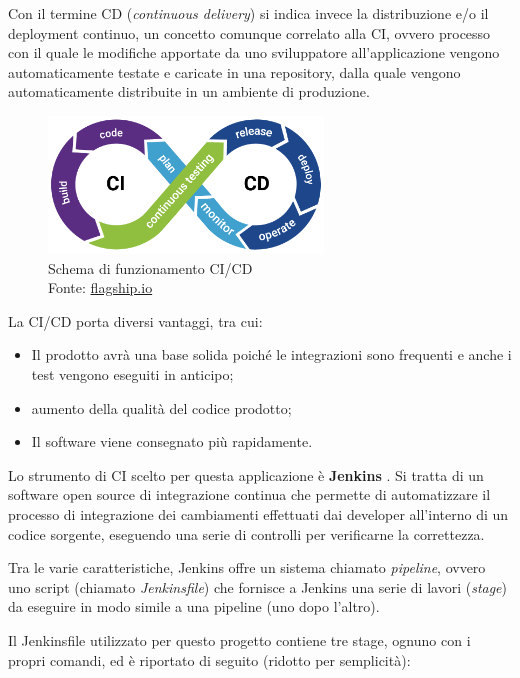 Con il termine CD (\textit{continuous delivery}) si indica invece la distribuzione e/o il deployment continuo, un concetto comunque correlato alla CI, ovvero processo con il quale le modifiche apportate da uno sviluppatore all'applicazione vengono automaticamente testate e caricate in una repository, dalla quale vengono automaticamente distribuite in un ambiente di produzione. \cite{cicd}

\begin{figure}[H]
\centering
\includegraphics[width=0.65\textwidth,height=\textheight,keepaspectratio]{img/ci}
\caption{Schema di funzionamento CI/CD\\Fonte: \url{flagship.io}}
\label{fig:cicd}
\end{figure}

La CI/CD porta diversi vantaggi, tra cui:
\begin{itemize}
  \item Il prodotto avrà una base solida poiché le integrazioni sono frequenti e anche i test vengono eseguiti in anticipo;
  \item aumento della qualità del codice prodotto;
  \item Il software viene consegnato più rapidamente.
\end{itemize}

Lo strumento di CI scelto per questa applicazione è \textbf{Jenkins} \cite{jenkins}. Si tratta di un software open source di integrazione continua che permette di automatizzare il processo di integrazione dei cambiamenti effettuati dai developer all'interno di un codice sorgente, eseguendo una serie di controlli per verificarne la correttezza.

Tra le varie caratteristiche, Jenkins offre un sistema chiamato \textit{pipeline}, ovvero uno script (chiamato \textit{Jenkinsfile}) che fornisce a Jenkins una serie di lavori (\textit{stage}) da eseguire in modo simile a una pipeline (uno dopo l'altro).

Il Jenkinsfile utilizzato per questo progetto contiene tre stage, ognuno con i propri comandi, ed è riportato di seguito (ridotto per semplicità):

